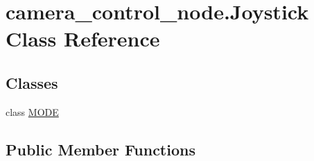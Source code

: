 \hypertarget{classcamera__control__node_1_1Joystick}{\section{camera\-\_\-control\-\_\-node.\-Joystick Class Reference}
\label{classcamera__control__node_1_1Joystick}
}
\subsection*{Classes}
\begin{DoxyCompactItemize}
\item 
class \hyperlink{classcamera__control__node_1_1Joystick_1_1MODE}{M\-O\-D\-E}
\end{DoxyCompactItemize}
\subsection*{Public Member Functions}
